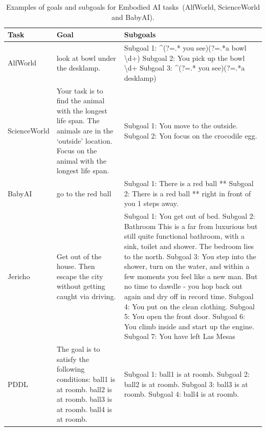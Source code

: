 
\begin{table}[t!]
\centering
\footnotesize
\begin{tabular}{p{2.0cm}p{5.25cm}p{5.25cm}}
\toprule
\textbf{Task} & \textbf{Goal} & \textbf{Subgoals} \\ \midrule
AlfWorld
&
look at bowl under the desklamp.
&
Subgoal 1: \textasciicircum(?=.* you see)(?=.*a bowl \textbackslash d+) \newline
Subgoal 2: You pick up the bowl \textbackslash d+ \newline
Subgoal 3: \textasciicircum(?=.* you see)(?=.*a desklamp)
\\
\midrule
ScienceWorld
&
Your task is to find the animal with the longest life span. The animals are in the `outside' location. Focus on the animal with the longest life span.
&
Subgoal 1: You move to the outside.\newline
Subgoal 2: You focus on the crocodile egg.
\\
\midrule

BabyAI
&
go to the red ball
&
Subgoal 1: There is a red ball ** \newline
Subgoal 2: There is a red ball ** right in front of you 1 steps away.
\\
\midrule
Jericho
&
Get out of the house. Then escape the city without getting caught via driving.
&
Subgoal 1: You get out of bed. \newline
Subgoal 2: Bathroom This is a far from luxurious but still quite functional bathroom, with a sink, toilet and shower. The bedroom lies to the north. \newline
Subgoal 3: You step into the shower, turn on the water, and within a few moments you feel like a new man. But no time to dawdle - you hop back out again and dry off in record time. \newline
Subgoal 4: You put on the clean clothing. \newline
Subgoal 5: You open the front door. \newline
Subgoal 6: You climb inside and start up the engine. \newline
Subgoal 7: You have left Las Mesas
\\
\midrule
PDDL
&
The goal is to satisfy the following conditions: ball1 is at roomb. ball2 is at roomb. ball3 is at roomb. ball4 is at roomb.
&
	
Subgoal 1: ball1 is at roomb. \newline
Subgoal 2: ball2 is at roomb. \newline
Subgoal 3: ball3 is at roomb. \newline
Subgoal 4: ball4 is at roomb.
\\
\bottomrule
\end{tabular}
\caption{Examples of goals and subgoals for Embodied AI tasks~(AlfWorld, ScienceWorld and BabyAI).}
\label{tab:subgoal_annotation_1}
\end{table}


